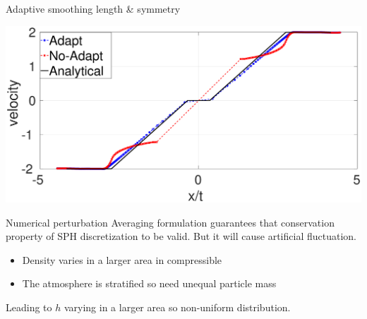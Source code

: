 \documentclass{beamer}
\begin{document}
\begin{frame}{Adaptive smoothing length \& symmetry}
\begin{minipage}{.43\textwidth}
\end{minipage}%
\begin{minipage}{.43 \textwidth}
        \centering
        \includegraphics[width=0.88 \textwidth]{./Chapter-3/Figures/Sjogreen-adptVSno-v}
\end{minipage}%
\end{frame}

\begin{frame}{Numerical perturbation}
Averaging formulation guarantees that conservation property of SPH discretization to be valid. But it will cause artificial fluctuation. \\
\begin{minipage}{.480\linewidth} 
\end{minipage}
\hfill
\begin{minipage}{.480\linewidth} 
\end{minipage}
%  
\begin{itemize}
\item Density varies in a larger area in compressible
\item The atmosphere is stratified so need unequal particle mass
\end{itemize}
Leading to $h$ varying in a larger area so non-uniform distribution.
\end{frame}
\end{document}
